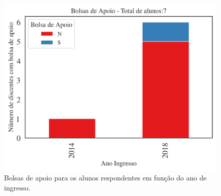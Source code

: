 \documentclass[a4paper,10pt]{article}
\begin{document}
\begin{figure}[h]
\centering
\includegraphics[width=0.99\linewidth]{quantitativos_bolsa_de_apoio_113525}
\caption{\label{fig:bolsaano} Bolsas de apoio para os alunos respondentes em função do ano de ingresso.}
\end{figure}
\end{document}
